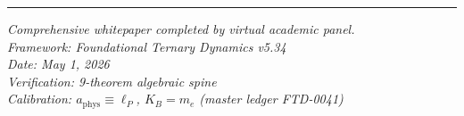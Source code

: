 \documentclass[11pt,a4paper]{article}
\begin{document}
\vspace{2em}
\hrule
\vspace{1em}
\begin{center}
\textit{Comprehensive whitepaper completed by virtual academic panel.}\\
\textit{Framework: Foundational Ternary Dynamics v5.34}\\
\textit{Date: May 1, 2026}\\
\textit{Verification: 9-theorem algebraic spine}\\
\textit{Calibration: $a_{\text{phys}} \equiv \ell_P$, $K_B = m_e$ (master ledger FTD-0041)}
\end{center}
\end{document}
